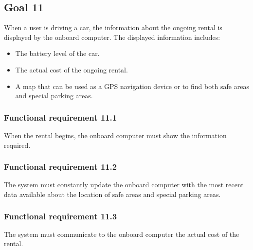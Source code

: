 \subsection{Goal 11}
When a user is driving a car, the information about the ongoing rental is displayed by the onboard computer. The displayed information includes:
\begin{itemize}
		\item The battery level of the car.
		\item The actual cost of the ongoing rental.
		\item A map that can be used as a GPS navigation device or to find both safe areas and special parking areas.
\end{itemize}

\setcounter{secnumdepth}{3}
\subsubsection{Functional requirement 11.1}
When the rental begins, the onboard computer must show the information required.

\subsubsection{Functional requirement 11.2}
The system must constantly update the onboard computer with the most recent data available about the location of safe areas and special parking areas.

\subsubsection{Functional requirement 11.3}
The system must communicate to the onboard computer the actual cost of the rental.
